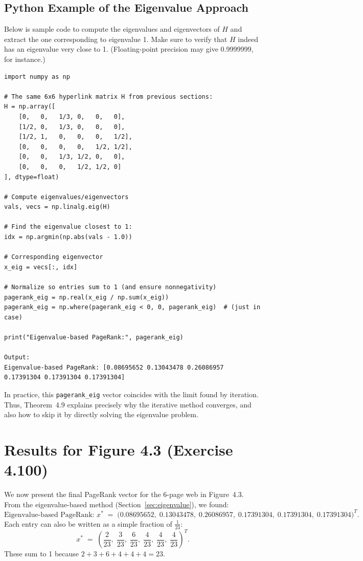 \documentclass{article}
\begin{document}
\subsection{Python Example of the Eigenvalue Approach}
Below is sample code to compute the eigenvalues and eigenvectors of $H$ and extract 
the one corresponding to eigenvalue 1. Make sure to verify that $H$ indeed has an 
eigenvalue very close to 1. (Floating-point precision may give 0.9999999, for instance.)

\begin{verbatim}
import numpy as np

# The same 6x6 hyperlink matrix H from previous sections:
H = np.array([
    [0,   0,   1/3, 0,   0,   0],
    [1/2, 0,   1/3, 0,   0,   0],
    [1/2, 1,   0,   0,   0,   1/2],
    [0,   0,   0,   0,   1/2, 1/2],
    [0,   0,   1/3, 1/2, 0,   0],
    [0,   0,   0,   1/2, 1/2, 0]
], dtype=float)

# Compute eigenvalues/eigenvectors
vals, vecs = np.linalg.eig(H)

# Find the eigenvalue closest to 1:
idx = np.argmin(np.abs(vals - 1.0))

# Corresponding eigenvector
x_eig = vecs[:, idx]

# Normalize so entries sum to 1 (and ensure nonnegativity)
pagerank_eig = np.real(x_eig / np.sum(x_eig))
pagerank_eig = np.where(pagerank_eig < 0, 0, pagerank_eig)  # (just in case)

print("Eigenvalue-based PageRank:", pagerank_eig)

Output:
Eigenvalue-based PageRank: [0.08695652 0.13043478 0.26086957 0.17391304 0.17391304 0.17391304]
\end{verbatim}

\noindent
In practice, this \texttt{pagerank\_eig} vector coincides with the limit found by iteration. 
Thus, Theorem~4.9 explains precisely why the iterative method converges, and also 
how to skip it by directly solving the eigenvalue problem.



\section{Results for Figure 4.3 (Exercise 4.100)}

We now present the final PageRank vector for the 6-page web in Figure~4.3. 
From the eigenvalue-based method (Section~\ref{sec:eigenvalue}), we found:
\[
\text{Eigenvalue-based PageRank: } 
x^* 
\;=\;
\bigl(
0.08695652,\;
0.13043478,\;
0.26086957,\;
0.17391304,\;
0.17391304,\;
0.17391304
\bigr)^T.
\]
\noindent
Each entry can also be written as a simple fraction of $\tfrac{1}{23}$:
\[
x^* 
\;=\;
\left(
\frac{2}{23},\;
\frac{3}{23},\;
\frac{6}{23},\;
\frac{4}{23},\;
\frac{4}{23},\;
\frac{4}{23}
\right)^T.
\]
These sum to 1 because $2 + 3 + 6 + 4 + 4 + 4 = 23$.
\end{document}
